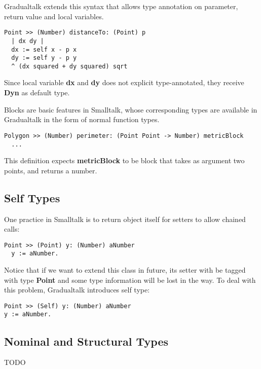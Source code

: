 Gradualtalk extends this syntax that allows
type annotation on parameter, return value and local variables.

\begin{verbatim}
Point >> (Number) distanceTo: (Point) p
  | dx dy |
  dx := self x - p x
  dy := self y - p y
  ^ (dx squared + dy squared) sqrt
\end{verbatim}

Since local variable \textbf{dx} and \textbf{dy} does not explicit type-annotated,
they receive \textbf{Dyn} as default type.

Blocks are basic features in Smalltalk,
whose corresponding types are available in Gradualtalk in the form of normal function types.

\begin{verbatim}
Polygon >> (Number) perimeter: (Point Point -> Number) metricBlock
  ...
\end{verbatim}

This definition expects \textbf{metricBlock} to be block
that takes as argument two points, and returns a number.

\subsection{Self Types}

One practice in Smalltalk is to return object itself for setters
to allow chained calls:

\begin{verbatim}
Point >> (Point) y: (Number) aNumber
  y := aNumber.
\end{verbatim}

Notice that if we want to extend this class in future,
its setter with be tagged with type \textbf{Point} and some
type information will be lost in the way.
To deal with this problem, Gradualtalk introduces self type:

\begin{verbatim}
Point >> (Self) y: (Number) aNumber
y := aNumber.
\end{verbatim}

\subsection{Nominal and Structural Types}

TODO